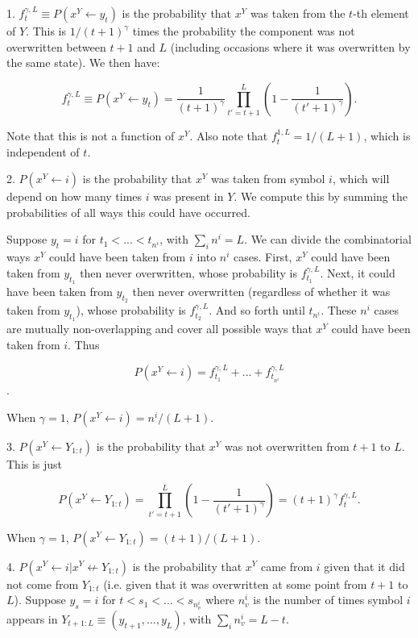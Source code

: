 \documentclass{article}
\begin{document}
\begin{appendices}
1. $f^{\gamma,L}_t \equiv P(x^Y \leftarrow y_t)$ is the probability that $x^Y$ was taken from the $t$-th element of $Y$. This is $1/(t+1)^\gamma$ times the probability the component was not overwritten between $t+1$ and $L$ (including occasions where it was overwritten by the same state). We then have:

$$f^{\gamma,L}_t \equiv P(x^Y \leftarrow y_t) = \frac{1}{(t+1)^\gamma}\prod\limits_{t' = t+1}^L\left(1 - \frac{1}{(t'+1)^\gamma}\right).$$

Note that this is not a function of $x^Y$. Also note that $f^{1,L}_t = 1/(L+1)$, which is independent of $t$.

2. $P(x^Y \leftarrow i)$ is the probability that $x^Y$ was taken from symbol $i$, which will depend on how many times $i$ was present in $Y$. We compute this by summing the probabilities of all ways this could have occurred.

Suppose $y_t = i$ for $t_1 < ... < t_{n^i}$, with $\sum_i n^i = L$. We can divide the combinatorial ways $x^Y$ could have been taken from $i$ into $n^i$ cases. First, $x^Y$ could have been taken from $y_{t_1}$ then never overwritten, whose probability is $f^{\gamma,L}_{t_1}$. Next, it could have been taken from $y_{t_2}$ then never overwritten (regardless of whether it was taken from $y_{t_1}$), whose probability is $f^{\gamma,L}_{t_2}$. And so forth until $t_{n^i}$. These $n^i$ cases are mutually non-overlapping and cover all possible ways that $x^Y$ could have been taken from $i$. Thus

$$P(x^Y \leftarrow i) = f^{\gamma,L}_{t_1} + ... + f^{\gamma,L}_{t_{n^i}}$$.

When $\gamma = 1$, $P(x^Y \leftarrow i) = n^i/(L+1)$.

3. $P(x^Y \leftarrow Y_{1:t})$ is the probability that $x^Y$ was not overwritten from $t+1$ to $L$. This is just

$$P(x^Y \leftarrow Y_{1:t}) = \prod\limits_{t' = t+1}^L \left(1 - \frac{1}{(t'+1)^\gamma}\right) = (t+1)^\gamma f^{\gamma,L}_t.$$

When $\gamma = 1$, $P(x^Y \leftarrow Y_{1:t}) = (t+1)/(L+1)$.

4. $P(x^Y \leftarrow i|x^Y \not \leftarrow Y_{1:t})$ is the probability that $x^Y$ came from $i$ given that it did not come from $Y_{1:t}$ (i.e. given that it was overwritten at some point from $t+1$ to $L$). Suppose $y_s = i$ for $t < s_1 < ... < s_{n^i_v}$ where $n^i_v$ is the number of times symbol $i$ appears in $Y_{t+1:L} \equiv (y_{t+1}, ..., y_L)$, with $\sum\limits_i n^i_v = L-t$.


\end{appendices}
\end{document}
